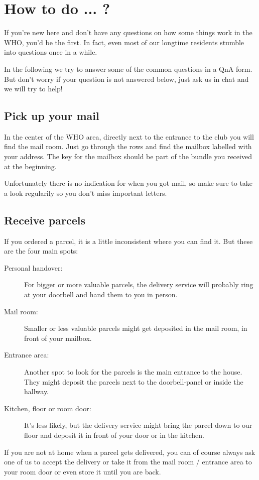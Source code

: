 \chapter{How to do ... ?} \label{chap:qna}
If you're new here and don't have any questions on how some things work in the WHO, you'd be the first. In fact, even most of our longtime residents stumble into questions once in a while.

In the following we try to answer some of the common questions in a QnA form. But don't worry if your question is not answered below, just ask us in chat and we will try to help!

\section{Pick up your mail}
In the center of the WHO area, directly next to the entrance to the club  you will find the mail room. Just go through the rows and find the mailbox labelled with your address. The key for the mailbox should be part of the bundle you received at the beginning. 

Unfortunately there is no indication for when you got mail, so make sure to take a look regularily so you don't miss important letters.

\section{Receive parcels}
If you ordered a parcel, it is a little inconsistent where you can find it. But these are the four main spots:
\begin{description}
    \item[Personal handover:] For bigger or more valuable parcels, the delivery service will probably ring at your doorbell and hand them to you in person.
    \item[Mail room:] Smaller or less valuable parcels might get deposited in the mail room, in front of your mailbox.
    \item[Entrance area:] Another spot to look for the parcels is the main entrance to the house. They might deposit the parcels next to the doorbell-panel or inside the hallway.
    \item[Kitchen, floor or room door:] It's less likely, but the delivery service might bring the parcel down to our floor and deposit it in front of your door or in the kitchen.
\end{description}

If you are not at home when a parcel gets delivered, you can of course always ask one of us to accept the delivery or take it from the mail room / entrance area to your room door or even store it until you are back.

